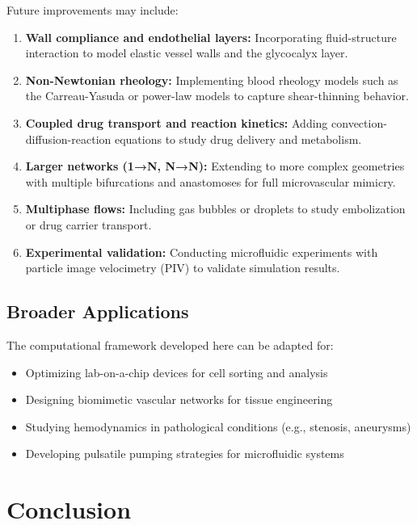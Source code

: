 \documentclass[12pt,a4paper]{article}
\begin{document}
Future improvements may include:

\begin{enumerate}
  \item \textbf{Wall compliance and endothelial layers:} Incorporating fluid-structure interaction to model elastic vessel walls and the glycocalyx layer.
  
  \item \textbf{Non-Newtonian rheology:} Implementing blood rheology models such as the Carreau-Yasuda or power-law models to capture shear-thinning behavior.
  
  \item \textbf{Coupled drug transport and reaction kinetics:} Adding convection-diffusion-reaction equations to study drug delivery and metabolism.
  
  \item \textbf{Larger networks (1→N, N→N):} Extending to more complex geometries with multiple bifurcations and anastomoses for full microvascular mimicry.
  
  \item \textbf{Multiphase flows:} Including gas bubbles or droplets to study embolization or drug carrier transport.
  
  \item \textbf{Experimental validation:} Conducting microfluidic experiments with particle image velocimetry (PIV) to validate simulation results.
\end{enumerate}

\subsection{Broader Applications}

The computational framework developed here can be adapted for:

\begin{itemize}
  \item Optimizing lab-on-a-chip devices for cell sorting and analysis
  \item Designing biomimetic vascular networks for tissue engineering
  \item Studying hemodynamics in pathological conditions (e.g., stenosis, aneurysms)
  \item Developing pulsatile pumping strategies for microfluidic systems
\end{itemize}

\section{Conclusion}
\end{document}
